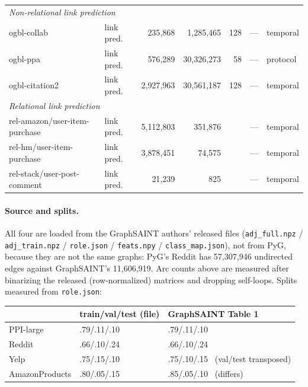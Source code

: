 \documentclass[11pt]{article}
\begin{document}
\begin{table}[H]
\begin{tabular}{llrrrrl}
\multicolumn{7}{l}{\textit{Non-relational link prediction}}\\
ogbl-collab    & link pred. & 235{,}868     & 1{,}285{,}465  & 128 & --- & temporal \\
ogbl-ppa       & link pred. & 576{,}289     & 30{,}326{,}273 & 58  & --- & protocol \\
ogbl-citation2 & link pred. & 2{,}927{,}963 & 30{,}561{,}187 & 128 & --- & temporal \\
\midrule
\multicolumn{7}{l}{\textit{Relational link prediction}}\\
rel-amazon/user-item-purchase & link pred. & 5{,}112{,}803 & 351{,}876 & & --- & temporal \\
rel-hm/user-item-purchase     & link pred. & 3{,}878{,}451 & 74{,}575  & & --- & temporal \\
rel-stack/user-post-comment   & link pred. & 21{,}239      & 825       & & --- & temporal \\
\bottomrule
\end{tabular}
\end{table}

\paragraph{Source and splits.} All four are loaded from the GraphSAINT authors'
released files (\texttt{adj\_full.npz} / \texttt{adj\_train.npz} /
\texttt{role.json} / \texttt{feats.npy} / \texttt{class\_map.json}), not from
PyG, because they are not the same graphs: PyG's Reddit has 57{,}307{,}946
undirected edges against GraphSAINT's 11{,}606{,}919. Arc counts above are
measured after binarizing the released (row-normalized) matrices and dropping
self-loops. Splits measured from \texttt{role.json}:

\begin{center}\footnotesize
\begin{tabular}{lll}
\toprule
& train/val/test (file) & GraphSAINT Table 1 \\
\midrule
PPI-large      & .79/.11/.10 & .79/.11/.10 \\
Reddit         & .66/.10/.24 & .66/.10/.24 \\
Yelp           & .75/.15/.10 & .75/.10/.15 \ (val/test transposed) \\
AmazonProducts & .80/.05/.15 & .85/.05/.10 \ (differs) \\
\bottomrule
\end{tabular}
\end{center}
\end{document}
